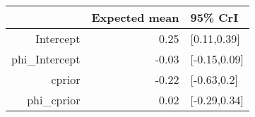 \begin{tabular}{rrl}
  \hline
 & Expected mean & 95\% CrI \\ 
  \hline
Intercept & 0.25 & [0.11,0.39] \\ 
  phi\_Intercept & -0.03 & [-0.15,0.09] \\ 
  cprior & -0.22 & [-0.63,0.2] \\ 
  phi\_cprior & 0.02 & [-0.29,0.34] \\ 
   \hline
\end{tabular}

